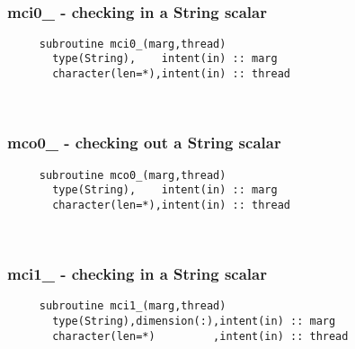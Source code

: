  
\mbox{}\hrulefill\ 
 
  \subsubsection{mci0\_ - checking in a String scalar}

\begin{verbatim} 
     subroutine mci0_(marg,thread)
       type(String),    intent(in) :: marg
       character(len=*),intent(in) :: thread
 \end{verbatim}%
 
 
\mbox{}\hrulefill\ 

  \subsubsection{mco0\_ - checking out a String scalar}

\begin{verbatim} 
     subroutine mco0_(marg,thread)
       type(String),    intent(in) :: marg
       character(len=*),intent(in) :: thread
 \end{verbatim}%
 
 
\mbox{}\hrulefill\ 
 
  \subsubsection{mci1\_ - checking in a String scalar}

\begin{verbatim} 
     subroutine mci1_(marg,thread)
       type(String),dimension(:),intent(in) :: marg
       character(len=*)         ,intent(in) :: thread
 \end{verbatim}%
 
